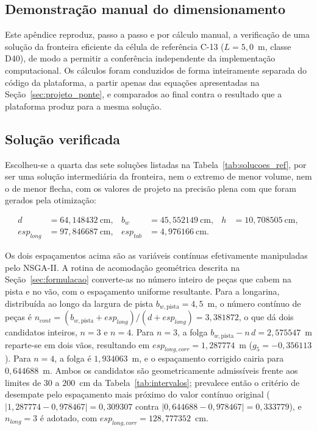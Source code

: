 \begin{appendices}

\section{Demonstração manual do dimensionamento}\label{ap:demonstracao}

Este apêndice reproduz, passo a passo e por cálculo manual, a verificação de uma solução da fronteira eficiente da célula de referência C-13 ($L = 5{,}0$~m, classe D40), de modo a permitir a conferência independente da implementação computacional.
Os cálculos foram conduzidos de forma inteiramente separada do código da plataforma, a partir apenas das equações apresentadas na Seção~\ref{sec:projeto_ponte}, e comparados ao final contra o resultado que a plataforma produz para a mesma solução.

\subsection{Solução verificada}

Escolheu-se a quarta das sete soluções listadas na Tabela~\ref{tab:solucoes_ref}, por ser uma solução intermediária da fronteira, nem o extremo de menor volume, nem o de menor flecha, com os valores de projeto na precisão plena com que foram gerados pela otimização:

\begin{align*}
d &= 64{,}148432~\text{cm}, & b_w &= 45{,}552149~\text{cm}, & h &= 10{,}708505~\text{cm}, \\
esp_{long} &= 97{,}846687~\text{cm}, & esp_{tab} &= 4{,}976166~\text{cm}. &&
\end{align*}

Os dois espaçamentos acima são as variáveis contínuas efetivamente manipuladas pelo NSGA-II. A rotina de acomodação geométrica descrita na Seção~\ref{sec:formulacao} converte-as no número inteiro de peças que cabem na pista e no vão, com o espaçamento uniforme resultante.
Para a longarina, distribuída ao longo da largura de pista $b_{w,\mathrm{pista}} = 4{,}5$~m, o número contínuo de peças é $n_{cont} = (b_{w,\mathrm{pista}} + esp_{long})/(d + esp_{long}) = 3{,}381872$, o que dá dois candidatos inteiros, $n = 3$ e $n = 4$.
Para $n = 3$, a folga $b_{w,\mathrm{pista}} - n\,d = 2{,}575547$~m reparte-se em dois vãos, resultando em $esp_{long,corr} = 1{,}287774$~m ($g_5 = -0{,}356113$). Para $n = 4$, a folga é $1{,}934063$~m, e o espaçamento corrigido cairia para $0{,}644688$~m.
Ambos os candidatos são geometricamente admissíveis frente aos limites de $30$ a $200$~cm da Tabela~\ref{tab:intervalos}; prevalece então o critério de desempate pelo espaçamento mais próximo do valor contínuo original ($|1{,}287774 - 0{,}978467| = 0{,}309307$ contra $|0{,}644688 - 0{,}978467| = 0{,}333779$), e $n_{long} = 3$ é adotado, com $esp_{long,corr} = 128{,}777352$~cm.


\end{appendices}
